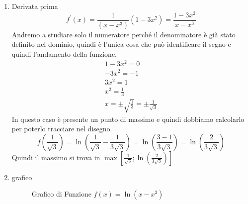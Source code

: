 \begin{enumerate}
	\item Derivata prima
	\begin{equation*}
		f^\prime(x)=\frac{1}{(x-x^3)}\left(1-3x^2\right)=\frac{1-3x^2}{x-x^3}
	\end{equation*}
	Andremo a studiare solo il numeratore perché il denominatore è già stato definito nel dominio, quindi è l'unica cosa che può identificare il segno e quindi l'andamento della funzione.
	\begin{equation}
		\begin{matrix}
			1-3x^2=0\\
			-3x^2=-1\\
			3x^2=1\\
			x^2=\frac{1}{3}\\
			x=\pm\sqrt{\frac{1}{3}}=\pm\frac{1}{\sqrt{3}}
		\end{matrix}
	\end{equation}
	In questo caso è presente un punto di massimo e quindi dobbiamo calcolarlo per poterlo tracciare nel disegno.
	\begin{equation*}
		f\left(\frac{1}{\sqrt{3}}\right)=\ln\left(\frac{1}{\sqrt{3}}-\frac{1}{3\sqrt{3}}\right)=\ln\left(\frac{3-1}{3\sqrt{3}}\right)=\ln\left(\frac{2}{3\sqrt{3}}\right)
	\end{equation*}
	Quindi il massimo si trova in $\max\left[\frac{1}{\sqrt{3}}; \ln\left(\frac{2}{3\sqrt{3}} \right) \right]$
	\item grafico
	\begin{figure}[!ht]
		\centering
		\caption{Grafico di Funzione $f(x)=\ln\left(x-x^3\right)$}
	\end{figure}
\end{enumerate}

